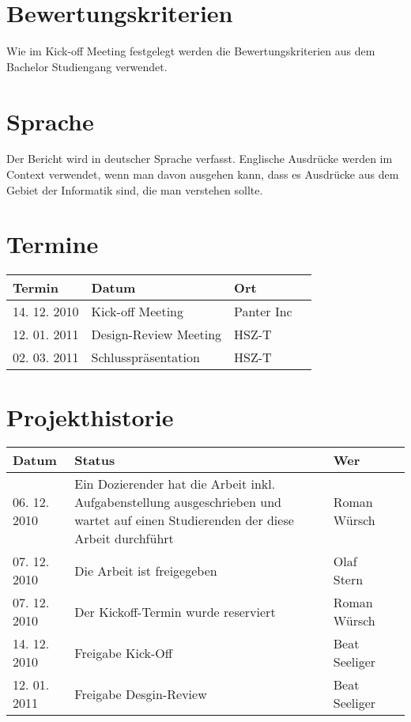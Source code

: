 \documentclass[listof=totocnumbered, bibliography=totocnumbered]{scrreprt}
\begin{document}
  \newpage
  
  \section{Bewertungskriterien}
  
  Wie im Kick-off Meeting festgelegt werden die Bewertungskriterien aus dem
  Bachelor Studiengang verwendet. 
  
  \section{Sprache}
  
  Der Bericht wird in deutscher Sprache verfasst. Englische Ausdrücke werden im
  Context verwendet, wenn man davon ausgehen kann, dass es Ausdrücke aus dem
  Gebiet der Informatik sind, die man verstehen sollte.
  
  \section{Termine}
  
  \begin{tabular}{lp{10cm}ll}
    \toprule
    Termin & Datum & Ort \\
    \midrule
    14. 12. 2010 & Kick-off Meeting & Panter Inc\\
    12. 01. 2011 & Design-Review Meeting & HSZ-T\\
    02. 03. 2011 & Schlusspräsentation & HSZ-T\\
    \bottomrule
  \end{tabular}
  
  \section{Projekthistorie}
  
  \begin{tabular}{lp{10cm}ll}
    \toprule
    Datum & Status & Wer \\
    \midrule
    06. 12. 2010 & Ein Dozierender hat die Arbeit inkl. Aufgabenstellung
    ausgeschrieben und wartet auf einen Studierenden der diese Arbeit
    durchführt & Roman Würsch\\
    07. 12. 2010 & Die Arbeit ist freigegeben & Olaf Stern\\
    07. 12. 2010 & Der Kickoff-Termin wurde reserviert & Roman Würsch\\
    14. 12. 2010 & Freigabe Kick-Off & Beat Seeliger\\
    12. 01. 2011 & Freigabe Desgin-Review & Beat Seeliger\\
    \bottomrule
  \end{tabular}
  
\end{document}
